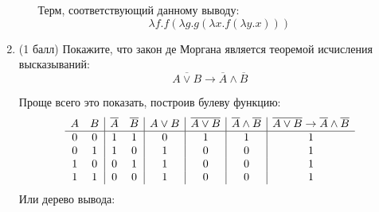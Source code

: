 \begin{enumerate}
\begin{itemize}
    \begin{solution}
      \hspace{0.01cm}
      \begin{prooftree}
      \end{prooftree}
      Терм, соответствующий данному выводу:
      \begin{equation}
        \lambda f. f (\lambda g. g (\lambda x . f (\lambda y . x)))
      \end{equation}
    \end{solution}
  \end{itemize}
  \item (1 балл) Покажите, что закон де Моргана является теоремой исчисления высказываний:
  $$\overline{A \lor B} \rightarrow \overline{A} \land \overline{B}$$
  \begin{solution}
    Проще всего это показать, построив булеву функцию:
    \begin{displaymath}
      \begin{array}{c c|c c|c|c|c|c}
        A & B & \overline{A} & \overline{B} & A \lor B & \overline{A \lor B} & \overline{A} \land \overline{B} & \overline{A \lor B} \rightarrow \overline{A} \land \overline{B}\\
        \hline
        0 & 0 & 1 & 1 & 0 & 1 & 1 & 1\\
        0 & 1 & 1 & 0 & 1 & 0 & 0 & 1\\
        1 & 0 & 0 & 1 & 1 & 0 & 0 & 1\\
        1 & 1 & 0 & 0 & 1 & 0 & 0 & 1\\
      \end{array}
    \end{displaymath}
    Или дерево вывода:
    \begin{prooftree}
    \end{prooftree}
  \end{solution}
\end{enumerate}
\clearpage

